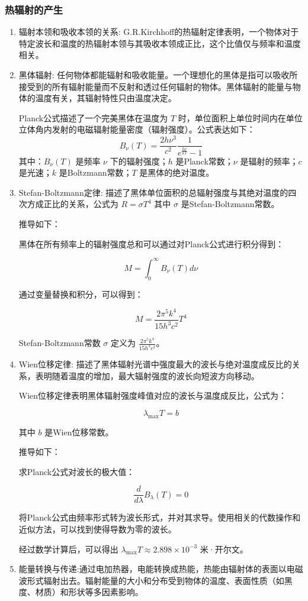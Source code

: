 \documentclass[dvipsnames, svgnames,a4paper,11pt]{article}
\begin{document}
	\subsubsection{热辐射的产生}
	\begin{enumerate}
		\item 辐射本领和吸收本领的关系: G.R.Kirchhoff的热辐射定律表明，一个物体对于特定波长和温度的热辐射本领与其吸收本领成正比，这个比值仅与频率和温度相关。
		
		\item 黑体辐射: 任何物体都能辐射和吸收能量。一个理想化的黑体是指可以吸收所接受到的所有辐射能量而不反射和透过任何辐射的物体。黑体辐射的能量与物体的温度有关，其辐射特性只由温度决定。
		
		Planck公式描述了一个完美黑体在温度为 \( T \) 时，单位面积上单位时间内在单位立体角内发射的电磁辐射能量密度（辐射强度）。公式表达如下：
		\[
		B_\nu(T) = \frac{2h\nu^3}{c^2} \frac{1}{e^{\frac{h\nu}{kT}} - 1}
		\]
		其中：\( B_\nu(T) \) 是频率 \( \nu \) 下的辐射强度；\( h \) 是Planck常数；\( \nu \) 是辐射的频率；\( c \) 是光速；\( k \) 是Boltzmann常数；\( T \) 是黑体的绝对温度。
		
		\item Stefan-Boltzmann定律: 描述了黑体单位面积的总辐射强度与其绝对温度的四次方成正比的关系，公式为 \( R = \sigma T^4 \) 其中 \( \sigma \) 是Stefan-Boltzmann常数。
		
		推导如下：
		
		黑体在所有频率上的辐射强度总和可以通过对Planck公式进行积分得到：
		
		\[
		M = \int_0^\infty B_\nu(T) d\nu
		\]
		
		通过变量替换和积分，可以得到：
		
		\[
		M = \frac{2\pi^5 k^4}{15h^3c^2} T^4
		\]
		
		Stefan-Boltzmann常数 \( \sigma \) 定义为 \( \frac{2\pi^5 k^4}{15h^3c^2} \)。
		
		\item Wien位移定律: 描述了黑体辐射光谱中强度最大的波长与绝对温度成反比的关系，表明随着温度的增加，最大辐射强度的波长向短波方向移动。
		
		Wien位移定律表明黑体辐射强度峰值对应的波长与温度成反比，公式为：
		
		\[
		\lambda_{\text{max}} T = b
		\]
		
		其中 \( b \) 是Wien位移常数。
		
		推导如下：
		
		求Planck公式对波长的极大值：
		
		\[
		\frac{d}{d\lambda} B_\lambda(T) = 0
		\]
		
		将Planck公式由频率形式转为波长形式，并对其求导。使用相关的代数操作和近似方法，可以找到使得导数为零的波长。
		
		经过数学计算后，可以得出 \( \lambda_{\text{max}} T \approx 2.898 \times 10^{-3} \) 米·开尔文。
		
		\item 能量转换与传递:通过电加热器，电能转换成热能，热能由辐射体的表面以电磁波形式辐射出去。辐射能量的大小和分布受到物体的温度、表面性质（如黑度、材质）和形状等多因素影响。
	\end{enumerate}
	
\end{document}
